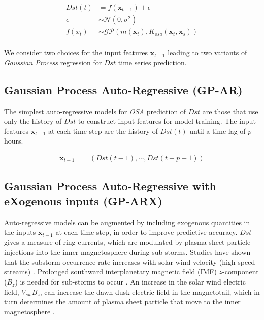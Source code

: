 \documentclass{article}
\providecommand{\DIFadd}[1]{{\protect\color{blue}\uwave{#1}}} %
\providecommand{\DIFdel}[1]{{\protect\color{red}\sout{#1}}}                      %
\providecommand{\DIFaddbegin}{} %
\providecommand{\DIFaddend}{} %
\providecommand{\DIFdelbegin}{} %
\providecommand{\DIFdelend}{} %
\newcommand{\DIFscaledelfig}{0.5}
\newlength{\DIFdelgraphicswidth} %
\newlength{\DIFdelgraphicsheight} %
\newcommand{\DIFaddincludegraphics}[2][]{{\color{blue}\fbox{\DIFOincludegraphics[#1]{#2}}}} %
\newcommand{\DIFdelincludegraphics}[2][]{%
\sbox{\DIFdelgraphicsbox}{\DIFOincludegraphics[#1]{#2}}%
\settoboxwidth{\DIFdelgraphicswidth}{\DIFdelgraphicsbox} %
\settoboxtotalheight{\DIFdelgraphicsheight}{\DIFdelgraphicsbox} %
\scalebox{\DIFscaledelfig}{%
\parbox[b]{\DIFdelgraphicswidth}{\usebox{\DIFdelgraphicsbox}\\[-\baselineskip] \rule{\DIFdelgraphicswidth}{0em}}\llap{\resizebox{\DIFdelgraphicswidth}{\DIFdelgraphicsheight}{%
\setlength{\unitlength}{\DIFdelgraphicswidth}%
\begin{picture}(1,1)%
\thicklines\linethickness{2pt} %
{\color[rgb]{1,0,0}\put(0,0){\framebox(1,1){}}}%
{\color[rgb]{1,0,0}\put(0,0){\line( 1,1){1}}}%
{\color[rgb]{1,0,0}\put(0,1){\line(1,-1){1}}}%
\end{picture}%
}\hspace*{3pt}}} %
} %
\DeclareRobustCommand{\DIFaddbegin}{\DIFOaddbegin \let\includegraphics\DIFaddincludegraphics} %
\DeclareRobustCommand{\DIFaddend}{\DIFOaddend \let\includegraphics\DIFOincludegraphics} %
\DeclareRobustCommand{\DIFdelbegin}{\DIFOdelbegin \let\includegraphics\DIFdelincludegraphics} %
\DeclareRobustCommand{\DIFdelend}{\DIFOaddend \let\includegraphics\DIFOincludegraphics} %
\begin{document}
\begin{align}
  Dst(t) & =  f(\mathbf{x}_{t-1}) + \epsilon \label{eq:Dst} \\
  \epsilon & \sim  \mathcal{N}(0, \sigma^2) \label{eq:GPNoise} \\
  f(x_t) & \sim  \mathcal{GP}(m(\mathbf{x}_t), K_{osa}(\mathbf{x}_t, \mathbf{x}_s)) \label{eq:DstGP} \\
\end{align}

We consider two choices for the input features $\mathbf{x}_{t-1}$
leading to two variants of \emph{Gaussian Process} regression for
$Dst$ time series prediction.

\subsection{Gaussian Process Auto-Regressive (GP-AR)} \label{sec:gpar}

The simplest auto-regressive models for \emph{OSA} prediction of $Dst$
are those that use only the history of $Dst$ to construct input
features for model training. The input features $\mathbf{x}_{t-1}$ at
each time step are the history of $Dst(t)$ until a time lag of $p$ hours.

\begin{align*}
  \mathbf{x}_{t-1} = & \left(Dst(t-1), \cdots , Dst(t-p+1)\right)
\end{align*}

\subsection{Gaussian Process Auto-Regressive with eXogenous inputs (GP-ARX)} \label{sec:gparx}

Auto-regressive models can be augmented by including exogenous
quantities in the inputs $\mathbf{x}_{t-1}$ at each time step, in
order to improve predictive accuracy. $Dst$ gives a measure of ring
currents, which are modulated by plasma sheet particle injections into
the inner magnetosphere during \DIFdelbegin \DIFdel{sub-storms}\DIFdelend \DIFaddbegin \DIFadd{substorms}\DIFaddend . Studies have shown that the
substorm occurrence rate increases with solar wind velocity (high
speed streams) \citet{Kissinger2011,Newell2016}. Prolonged southward
interplanetary magnetic field (IMF) $z$-component ($B_z$) is needed
for sub-storms to occur \citet{McPherron1986}. An increase in the
solar wind electric field, $V_{sw}B_z$, can increase the dawn-dusk
electric field in the magnetotail, which in turn determines the amount
of plasma sheet particle that move to the inner magnetosphere
\citet{Friedel2001}.
\DIFaddbegin 
\end{document}

